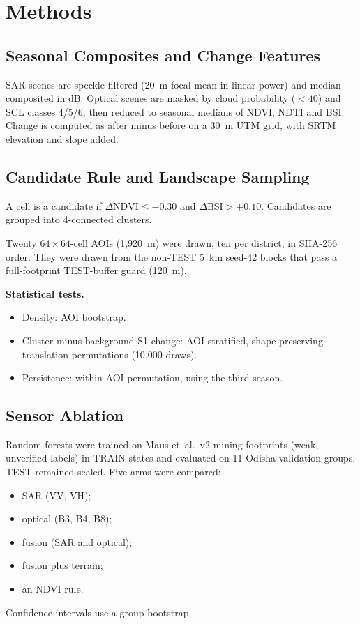 \documentclass[conference]{IEEEtran}
\begin{document}
\section{Methods}
\subsection{Seasonal Composites and Change Features}
SAR scenes are speckle-filtered (20~m focal mean in linear power) and median-composited in dB. Optical scenes are masked by cloud probability ($<40$) and SCL classes 4/5/6, then reduced to seasonal medians of NDVI, NDTI and BSI. Change is computed as after minus before on a 30~m UTM grid, with SRTM elevation and slope added.

\subsection{Candidate Rule and Landscape Sampling}
A cell is a candidate if $\Delta\mathrm{NDVI}\le-0.30$ and $\Delta\mathrm{BSI}>+0.10$. Candidates are grouped into 4-connected clusters.

Twenty $64\times64$-cell AOIs (1{,}920~m) were drawn, ten per district, in SHA-256 order. They were drawn from the non-TEST 5~km seed-42 blocks that pass a full-footprint TEST-buffer guard (120~m).

\textbf{Statistical tests.}
\begin{itemize}
\item Density: AOI bootstrap.
\item Cluster-minus-background S1 change: AOI-stratified, shape-preserving translation permutations (10{,}000 draws).
\item Persistence: within-AOI permutation, using the third season.
\end{itemize}

\subsection{Sensor Ablation}
Random forests were trained on Maus et~al.\ v2 mining footprints (weak, unverified labels) in TRAIN states and evaluated on 11 Odisha validation groups. TEST remained sealed. Five arms were compared:
\begin{itemize}
\item SAR (VV, VH);
\item optical (B3, B4, B8);
\item fusion (SAR and optical);
\item fusion plus terrain;
\item an NDVI rule.
\end{itemize}
Confidence intervals use a group bootstrap.
\end{document}
